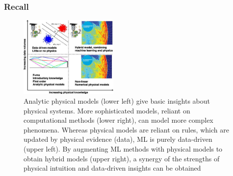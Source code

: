 \documentclass{beamer}
\begin{document}

\begin{frame}
	\frametitle{Recall}
	\begin{figure}
	\includegraphics[height=4cm]{./6_5_ml_acoustics.jpg}
		\caption{Analytic physical models (lower left) give basic insights about physical systems. More sophisticated models, reliant on computational methods (lower right), can model more complex phenomena. Whereas physical models are reliant on rules, which are updated by physical evidence (data), ML is purely data-driven (upper left). By augmenting ML methods with physical models to obtain hybrid models (upper right), a synergy of the strengths of physical intuition and data-driven insights can be obtained }
	\end{figure}
\end{frame}
\end{document}

